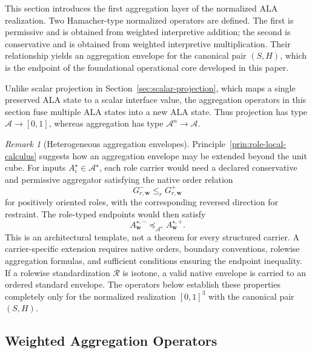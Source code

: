 \documentclass[reqno,final]{amsart}
\theoremstyle{definition}
\theoremstyle{plain}
\theoremstyle{remark}
\newtheorem{remark}{Remark}
\providecommand{\cA}{\mathcal{A}}
\begin{document}
This section introduces the first aggregation layer of the normalized ALA realization. Two Hamacher-type normalized operators are defined. The first is permissive and is obtained from weighted interpretive addition; the second is conservative and is obtained from weighted interpretive multiplication. Their relationship yields an aggregation envelope for the canonical pair \((S,H)\), which is the endpoint of the foundational operational core developed in this paper.

Unlike scalar projection in Section~\ref{sec:scalar-projection}, which maps a single preserved ALA state to a scalar interface value, the aggregation operators in this section fuse multiple ALA states into a new ALA state. Thus projection has type \(\cA\to[0,1]\), whereas aggregation has type \(\cA^n\to\cA\).

\begin{remark}[Heterogeneous aggregation envelopes]
\label{rem:heterogeneous-aggregation-envelope}
Principle~\ref{prin:role-local-calculus} suggests how an aggregation envelope may be extended beyond the unit cube. For inputs \(A_i^{\star}\in\mathcal A^{\star}\), each role carrier would need a declared conservative and permissive aggregator satisfying the native order relation
\[
G_{r,\mathbf w}^{-}
\leq_r
G_{r,\mathbf w}^{+}
\]
for positively oriented roles, with the corresponding reversed direction for restraint. The role-typed endpoints would then satisfy
\[
A_{\mathbf w}^{\star,-}
\preceq_{\mathcal A^{\star}}
A_{\mathbf w}^{\star,+}.
\]
This is an architectural template, not a theorem for every structured carrier. A carrier-specific extension requires native orders, boundary conventions, rolewise aggregation formulas, and sufficient conditions ensuring the endpoint inequality. If a rolewise standardization \(\mathcal R\) is isotone, a valid native envelope is carried to an ordered standard envelope. The operators below establish these properties completely only for the normalized realization \([0,1]^3\) with the canonical pair \((S,H)\).
\end{remark}

\subsection{Weighted Aggregation Operators}
\label{subsec:arithmetic-to-aggregation}
\end{document}
